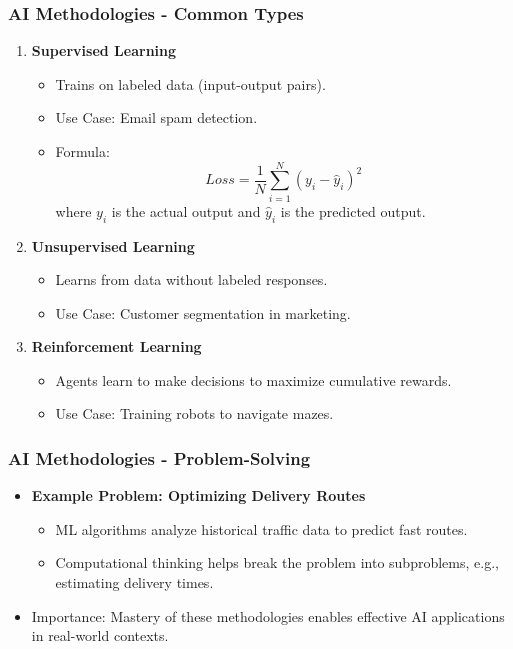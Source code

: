 \documentclass{beamer}
\begin{document}
\begin{frame}[fragile]
    \frametitle{AI Methodologies - Common Types}
    \begin{enumerate}
        \item \textbf{Supervised Learning}
            \begin{itemize}
                \item Trains on labeled data (input-output pairs).
                \item Use Case: Email spam detection.
                \item Formula: 
                \begin{equation}
                    Loss = \frac{1}{N} \sum_{i=1}^{N} (y_i - \hat{y}_i)^2
                \end{equation}
                where $y_i$ is the actual output and $\hat{y}_i$ is the predicted output.
            \end{itemize}

        \item \textbf{Unsupervised Learning}
            \begin{itemize}
                \item Learns from data without labeled responses.
                \item Use Case: Customer segmentation in marketing.
            \end{itemize}
        
        \item \textbf{Reinforcement Learning}
            \begin{itemize}
                \item Agents learn to make decisions to maximize cumulative rewards.
                \item Use Case: Training robots to navigate mazes.
            \end{itemize}
    \end{enumerate}
\end{frame}

\begin{frame}[fragile]
    \frametitle{AI Methodologies - Problem-Solving}
    \begin{itemize}
        \item \textbf{Example Problem: Optimizing Delivery Routes}
            \begin{itemize}
                \item ML algorithms analyze historical traffic data to predict fast routes.
                \item Computational thinking helps break the problem into subproblems, e.g., estimating delivery times.
            \end{itemize}
        \item Importance: Mastery of these methodologies enables effective AI applications in real-world contexts.
    \end{itemize}
\end{frame}
\end{document}
